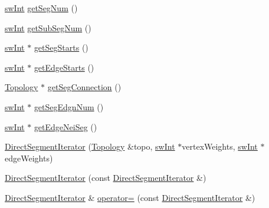 \begin{DoxyCompactItemize}
\item 
\mbox{\hyperlink{include_2swMacro_8h_a113cf5f6b5377cdf3fac6aa4e443e9aa}{sw\+Int}} \mbox{\hyperlink{classUNAT_1_1DirectSegmentIterator_a1c5edf64608f43c1bdf9a43ecb2b0b03}{get\+Seg\+Num}} ()
\item 
\mbox{\hyperlink{include_2swMacro_8h_a113cf5f6b5377cdf3fac6aa4e443e9aa}{sw\+Int}} \mbox{\hyperlink{classUNAT_1_1DirectSegmentIterator_a8aced068087f2492ad30376d6cec1294}{get\+Sub\+Seg\+Num}} ()
\item 
\mbox{\hyperlink{include_2swMacro_8h_a113cf5f6b5377cdf3fac6aa4e443e9aa}{sw\+Int}} $\ast$ \mbox{\hyperlink{classUNAT_1_1DirectSegmentIterator_a125018398a70e40dbb02b56316efbf5a}{get\+Seg\+Starts}} ()
\item 
\mbox{\hyperlink{include_2swMacro_8h_a113cf5f6b5377cdf3fac6aa4e443e9aa}{sw\+Int}} $\ast$ \mbox{\hyperlink{classUNAT_1_1DirectSegmentIterator_afd25b37163568da6c2982bd766d346af}{get\+Edge\+Starts}} ()
\item 
\mbox{\hyperlink{classUNAT_1_1Topology}{Topology}} $\ast$ \mbox{\hyperlink{classUNAT_1_1DirectSegmentIterator_aeddd507138479b1dad08053dd342bffb}{get\+Seg\+Connection}} ()
\item 
\mbox{\hyperlink{include_2swMacro_8h_a113cf5f6b5377cdf3fac6aa4e443e9aa}{sw\+Int}} $\ast$ \mbox{\hyperlink{classUNAT_1_1DirectSegmentIterator_ac3a4d43d27e6ba2a4bf68eb22af2c0ce}{get\+Seg\+Edgn\+Num}} ()
\item 
\mbox{\hyperlink{include_2swMacro_8h_a113cf5f6b5377cdf3fac6aa4e443e9aa}{sw\+Int}} $\ast$ \mbox{\hyperlink{classUNAT_1_1DirectSegmentIterator_a6f801e4fff4b069d6b1fcc3e70073639}{get\+Edge\+Nei\+Seg}} ()
\item 
\mbox{\hyperlink{classUNAT_1_1DirectSegmentIterator_acf8859148e589468d895eccec1f693a4}{Direct\+Segment\+Iterator}} (\mbox{\hyperlink{classUNAT_1_1Topology}{Topology}} \&topo, \mbox{\hyperlink{include_2swMacro_8h_a113cf5f6b5377cdf3fac6aa4e443e9aa}{sw\+Int}} $\ast$vertex\+Weights, \mbox{\hyperlink{include_2swMacro_8h_a113cf5f6b5377cdf3fac6aa4e443e9aa}{sw\+Int}} $\ast$edge\+Weights)
\item 
\mbox{\hyperlink{classUNAT_1_1DirectSegmentIterator_a7fc34e551631ed24ca7d877371352c2a}{Direct\+Segment\+Iterator}} (const \mbox{\hyperlink{classUNAT_1_1DirectSegmentIterator}{Direct\+Segment\+Iterator}} \&)
\item 
\mbox{\hyperlink{classUNAT_1_1DirectSegmentIterator}{Direct\+Segment\+Iterator}} \& \mbox{\hyperlink{classUNAT_1_1DirectSegmentIterator_ab0be9844ff31988358a78fc225b19868}{operator=}} (const \mbox{\hyperlink{classUNAT_1_1DirectSegmentIterator}{Direct\+Segment\+Iterator}} \&)

\end{DoxyCompactItemize}
